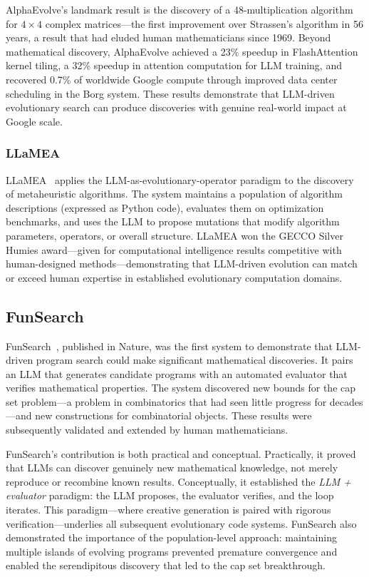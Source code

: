 \documentclass[11pt,a4paper]{article}
\begin{document}
AlphaEvolve's landmark result is the discovery of a 48-multiplication algorithm for $4\times4$ complex matrices---the first improvement over Strassen's algorithm in 56 years, a result that had eluded human mathematicians since 1969. Beyond mathematical discovery, AlphaEvolve achieved a 23\% speedup in FlashAttention kernel tiling, a 32\% speedup in attention computation for LLM training, and recovered 0.7\% of worldwide Google compute through improved data center scheduling in the Borg system. These results demonstrate that LLM-driven evolutionary search can produce discoveries with genuine real-world impact at Google scale.

\subsubsection{LLaMEA}

LLaMEA~\citep{lanzi2024llamea} applies the LLM-as-evolutionary-operator paradigm to the discovery of metaheuristic algorithms. The system maintains a population of algorithm descriptions (expressed as Python code), evaluates them on optimization benchmarks, and uses the LLM to propose mutations that modify algorithm parameters, operators, or overall structure. LLaMEA won the GECCO Silver Humies award---given for computational intelligence results competitive with human-designed methods---demonstrating that LLM-driven evolution can match or exceed human expertise in established evolutionary computation domains.

\subsection{FunSearch}

FunSearch~\citep{romera2024funsearch}, published in Nature, was the first system to demonstrate that LLM-driven program search could make significant mathematical discoveries. It pairs an LLM that generates candidate programs with an automated evaluator that verifies mathematical properties. The system discovered new bounds for the cap set problem---a problem in combinatorics that had seen little progress for decades---and new constructions for combinatorial objects. These results were subsequently validated and extended by human mathematicians.

FunSearch's contribution is both practical and conceptual. Practically, it proved that LLMs can discover genuinely new mathematical knowledge, not merely reproduce or recombine known results. Conceptually, it established the \emph{LLM + evaluator} paradigm: the LLM proposes, the evaluator verifies, and the loop iterates. This paradigm---where creative generation is paired with rigorous verification---underlies all subsequent evolutionary code systems. FunSearch also demonstrated the importance of the population-level approach: maintaining multiple islands of evolving programs prevented premature convergence and enabled the serendipitous discovery that led to the cap set breakthrough.
\end{document}
